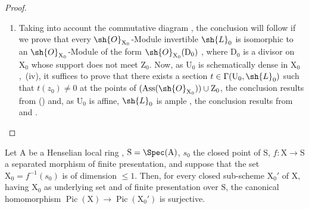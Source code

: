\begin{proof}
\begin{enumerate}[label=(\roman*)]
  \item Taking into account the commutative diagram , the conclusion will follow if we prove that every $\sh{O}_{\mathrm{X}_0}$-Module invertible $\sh{L}_0$ is isomorphic to an $\sh{O}_{\mathrm{X}_0}$-Module of the form $\sh{O}_{\mathrm{X}_0}(\mathrm{D}_0)$ , where $\mathrm{D}_0$ is a divisor on $\mathrm{X}_0$ whose support does not meet $\mathrm{Z}_0$.
Now, as $\mathrm{U}_0$ is schematically dense in $\mathrm{X}_0$ ,{}~(iv), it suffices to prove that there exists a section $t\in\Gamma(\mathrm{U}_0,\sh{L}_0)$ such that $t(z_0)\neq 0$ at the points of $(\operatorname{Ass}(\sh{O}_{\mathrm{X}_0}))\cup\mathrm{Z}_0$, the conclusion results from () and, as $\mathrm{U}_0$ is affine, $\sh{L}_0$ is ample , the conclusion results from  and .
\end{enumerate}
\end{proof}

\begin{corollary}[21.9.12]
\label{IV.21.9.12}
Let $\mathrm{A}$ be a Henselian local ring , $\mathrm{S}=\Spec(\mathrm{A})$, $s_0$ the closed point of $\mathrm{S}$, $f:\mathrm{X}\to\mathrm{S}$ a separated morphism of finite presentation, and suppose that the set $\mathrm{X}_0=f^{-1}(s_0)$ is of dimension $\leq 1$.
Then, for every closed sub-scheme $\mathrm{X}_0'$ of $\mathrm{X}$, having $\mathrm{X}_0$ as underlying set and of finite presentation over $\mathrm{S}$, the canonical homomorphism  $\operatorname{Pic}(\mathrm{X})\to\operatorname{Pic}(\mathrm{X}_0')$ is surjective.
\end{corollary}

